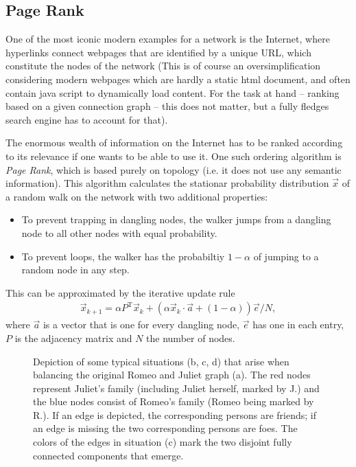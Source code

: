 \documentclass{scrartcl}
\begin{document}
\subsection{Page Rank}
One of the most iconic modern examples for a network is the Internet, 
where hyperlinks connect webpages that are identified 
by a unique URL, which constitute the nodes of the network (This is of course
an oversimplification considering modern webpages which are hardly a static 
html document, and often contain java script to dynamically load content. For
the task at hand -- ranking based on a given connection graph -- this does not
matter, but a fully fledges search engine has to account for that).

The enormous wealth of information on the Internet has to be ranked according
to its relevance if one wants to be able to use it. One such ordering algorithm 
is \emph{Page Rank}, which is based purely on topology (i.e. it does not use 
any semantic information). This algorithm calculates the stationar probability 
distribution $\vec{x}$ of a random walk on the network with two additional properties:
\begin{itemize}
 \item To prevent trapping in dangling nodes, the walker jumps from a dangling node
		to all other nodes with equal probability.
 \item To prevent loops, the walker has the probabiltiy $1-\alpha$ of jumping to a random	
	node in any step.
\end{itemize}

This can be approximated by the iterative update rule
\begin{align}
	\vec{x}_{k+1} = \alpha P^\mathrm{T} \vec{x}_k + \left(\alpha \vec{x}_k \cdot \vec{a} + (1 - \alpha) \right) \vec{e}/N,
\end{align}
where $\vec{a}$ is a vector that is one for every dangling node, $\vec{e}$ has one in each entry, $P$ is the
adjacency matrix and $N$ the number of nodes.



\begin{figure}
    \centering
    \def\svgwidth{0.9\textwidth}
    
    \caption{Depiction of some typical situations (b, c, d) that arise when
        balancing the original Romeo and Juliet graph (a). The red nodes
        represent Juliet's family (including Juliet herself, marked by J.) and
        the blue nodes consist of Romeo's family (Romeo being marked by
        R.). If an edge is depicted, the corresponding persons are friends;
        if an edge is missing the two corresponding persons are foes. The
        colors of the edges in situation (c) mark the two disjoint fully
        connected components that emerge.}
    \label{fig:D41}
\end{figure}
\end{document}
